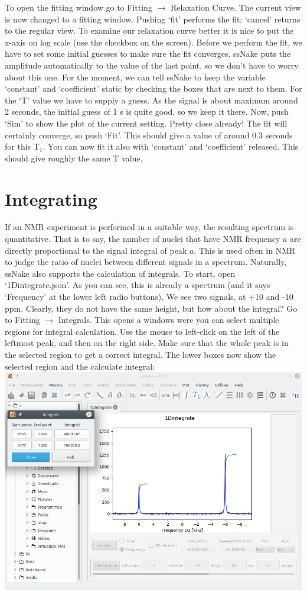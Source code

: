 \documentclass[11pt,a4paper]{article}
\begin{document}
To open the fitting window go to Fitting $\rightarrow$ Relaxation Curve. The current view is now
changed to a fitting window. Pushing `fit' performs the fit; `cancel' returns to the regular view.
To examine our relaxation curve better it is nice to put the x-axis on log scale (use the checkbox
on the screen). Before we perform the fit, we have to set some initial guesses to make sure the fit
converges. ssNake puts the amplitude automatically to the value of the last point, so we don't have
to worry about this one. For the moment, we can tell ssNake to keep the variable `constant' and
`coefficient' static by checking the boxes that are next to them. For the `T' value we have to
supply a guess. As the signal is about maximum around 2 seconds, the initial guess of 1 s is quite
good, so we keep it there. Now, push `Sim' to show the plot of the current setting. Pretty close
already! The fit will certainly converge, so push `Fit'. This should give a value of around 0.3
seconds for this T$_1$. You can now fit it also with `constant' and `coefficient' released. This
should give roughly the same T value.

\section{Integrating}
If an NMR experiment is performed in a suitable way, the resulting spectrum is quantitative. That is
to say, the number of nuclei that have NMR frequency $a$ are directly proportional to the signal
integral of peak $a$. This is used often in NMR to judge the ratio of nuclei between different
signals in a spectrum. Naturally, ssNake also supports the calculation of integrals. To start, open
`1Dintegrate.json'. As you can see, this is already a spectrum (and it says `Frequency' at the lower
left radio buttons). We see two signals, at +10 and -10 ppm. Clearly, they do not have the same
height, but how about the integral? Go to Fitting $\rightarrow$ Integrals. This opens a windows were
you can select multiple regions for integral calculation. Use the mouse to left-click on the left of
the leftmost peak, and then on the right side. Make sure that the whole peak is in the selected
region to get a correct integral. The lower boxes now show the selected region and the calculate
integral: 
\includegraphics[width=\linewidth]{Images/1Dintegrate.png}
\end{document}
